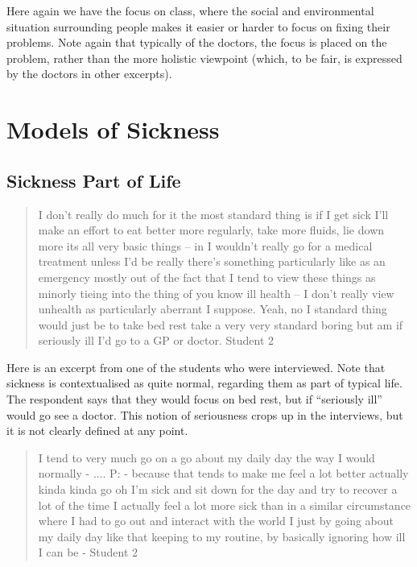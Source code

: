 Here again we have the focus on class, where the social and environmental situation surrounding people makes it easier or harder to focus on fixing their problems. Note again that typically of the doctors, the focus is placed on the problem, rather than the more holistic viewpoint (which, to be fair, is expressed by the doctors in other excerpts). 


\section{Models of Sickness}
\label{sec:models-sickness}



\subsection{Sickness Part of Life}
\label{sec:sickness-part-life}

\begin{quotation}
  I don't really do much for it the most standard thing is if I get sick I'll make an effort to eat better more regularly, take more fluids, lie down more its all very basic things – in I wouldn't really go for a medical treatment unless I'd be really there's something particularly like as an emergency mostly out of the fact that I tend to view these things as minorly tieing into the thing of you know ill health – I don't really view unhealth as particularly aberrant I suppose. Yeah, no I standard thing would just be to take bed rest take a very very standard boring but am if seriously ill I'd go to a GP or doctor.
Student 2
\end{quotation}

Here is an excerpt from one of the students who were interviewed. Note that sickness is contextualised as quite normal, regarding them as part of typical life. The respondent says that they would focus on bed rest, but if ``seriously ill'' would go see a doctor. This notion of seriousness crops up in the interviews, but it is not clearly defined at any point. 

\begin{quotation}
  I tend to very much go on a go about my daily day the way I would normally -
....
P: - because that tends to make me feel a lot better actually kinda kinda go oh I'm sick and sit down for the day and try to recover a lot of the time I actually feel a lot more sick than in a similar circumstance where I had to go out and interact with the world I just by going about my daily day like that keeping to my routine, by basically ignoring how ill I can be -
Student 2
\end{quotation}


